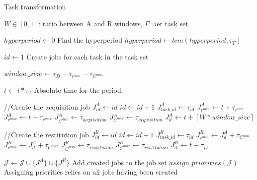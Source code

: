 \documentclass{kththesis}
\begin{document}
\begin{algorithm}
    \caption{Task transformation}
    \label{algo:task_transformation}
    \begin{algorithmic}[1]

        
        \renewcommand{\algorithmicrequire}{\textbf{Input:}}
        \Require $W \in [0, 1]$: ratio between A and R windows, $\Gamma$: \acrshort{aer} task set
        

        \State $hyperperiod \gets 0$
        \ForAll{$\tau \in \Gamma$}
            \Comment Find the hyperperiod
            \State $hyperperiod \gets lcm(hyperperiod, \tau_T)$
        \EndFor


        \State $id \gets 1$
        \ForAll{$\tau \in \Gamma$}
            \Comment Create jobs for each task in the task set

            \State $window\_size \gets \tau_{D} - \tau_{r^{min}} - \tau_{C^{max}}$ 

                \State $t \gets i * \tau_T$
                \Comment Absolute time for the period

                \State //Create the acquisition job
                \State $J^{A}_{id} \gets id$
                \State $id \gets id + 1$
                \State $J^{A}_{task\_id} \gets \tau_{id}$
                \State $J^{A}_{r^{min}} \gets t + \tau_{r^{min}}$
                \State $J^{A}_{r^{max}} \gets t + \tau_{r^{max}}$
                \State $J^{A}_{C^{min}} \gets \tau_{acquisition}$
                \State $J^{A}_{C^{max}} \gets \tau_{acquisition}$
                \State $J^{A}_d \gets t + \left \lceil{W * window\_size}\right \rceil $
                
                \State //Create the restitution job
                \State $J^{R}_{id} \gets id$
                \State $id \gets id + 1$
                \State $J^{R}_{task\_id} \gets \tau_{id}$
                \State $J^{R}_{r^{min}} \gets J^{A}_d + \tau_{C^{max}}$
                \State $J^{R}_{r^{max}} \gets J^{A}_d + \tau_{C^{max}}$
                \State $J^{R}_{C^{min}} \gets \tau_{restitution}$
                \State $J^{R}_{C^{max}} \gets \tau_{restitution}$
                \State $J^{R}_d \gets t + \tau_D $

                \State $\mathcal{J} \gets \mathcal{J} \cup \{J^A\} \cup \{J^R\}$
                \Comment Add created jobs to the job set
            \EndFor
        \EndFor
        \State $assign\_priorities(\mathcal{J})$
        \Comment Assigning priorities relies on all jobs having been created

    \end{algorithmic}
\end{algorithm}
\end{document}
